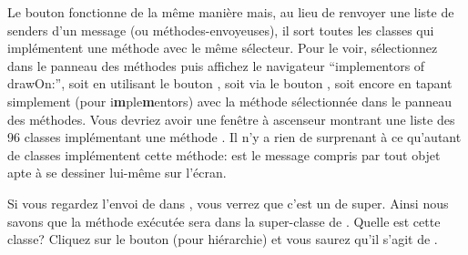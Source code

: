 \documentclass[a4paper,10pt,twoside]{book}
\begin{document}
Le bouton  fonctionne de la m\^eme mani\`ere mais,
au lieu de renvoyer une liste de senders d'un message (ou m\'ethodes-envoyeuses), il sort toutes les
classes qui impl\'ementent une m\'ethode avec le m\^eme s\'electeur.
Pour le voir, s\'electionnez  dans le panneau des m\'ethodes
puis affichez le navigateur ``implementors of drawOn:'', 
soit en utilisant le bouton , soit via le bouton 
, soit encore en tapant simplement  (pour {i\textbf{m}ple\textbf{m}entors}) avec la m\'ethode  s\'electionn\'ee dans le panneau des m\'ethodes. 
Vous devriez avoir une fen\^etre \`a ascenseur montrant une liste des 96
classes impl\'ementant une m\'ethode .
Il n'y a rien de surprenant \`a ce qu'autant de classes impl\'ementent cette
m\'ethode:  est le message compris par tout objet apte \`a se
dessiner lui-m\^eme sur l'\'ecran.


Si vous regardez l'envoi de  dans , vous
verrez que c'est un  de super. Ainsi nous
savons que la m\'ethode ex\'ecut\'ee sera dans la super-classe de . Quelle est cette classe? Cliquez sur le bouton  (pour hi\'erarchie) et vous saurez qu'il s'agit de .
\end{document}
